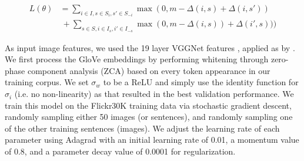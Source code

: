 \documentclass[11pt]{article}
\begin{document}
\begin{footnotesize}
\begin{align*}
L(\theta) & =\sum_{i\in I,s\in S_i ,s' \in S_{-i}}\max(0,m\!-\!\Delta(i,s) \!+\!\Delta(i,s')) \\
& \!\!\!\ +\sum_{s \in S, i \in I_s ,i'\in I_{-s}}\max(0,m\!-\!\Delta(i,s)) \!+\! \Delta(i',s)))
\end{align*}\end{footnotesize}

As input image features, we used the 19 layer VGGNet features \cite{Simonyan14c}, applied as  by .
 We first process the GloVe embeddings by performing whitening through zero-phase component analysis (ZCA)
\cite{DBLP:series/lncs/CoatesN12} based on every token appearance in our training corpus. We set $\sigma_w$ to be a ReLU and simply use the identity function for
 $\sigma_i$ (i.e. no non-linearity)  as that resulted in the best validation
 performance. We train this model on the Flickr30K training data via stochastic gradient descent,  randomly sampling either 50 images (or sentences), and randomly sampling one of the other training sentences (images). We  adjust the learning rate of each parameter using Adagrad \cite{Duchi:EECS-2010-24} with an initial learning rate of 0.01, a momentum value of 0.8, and a parameter decay value of 0.0001 for regularization.
\end{document}
